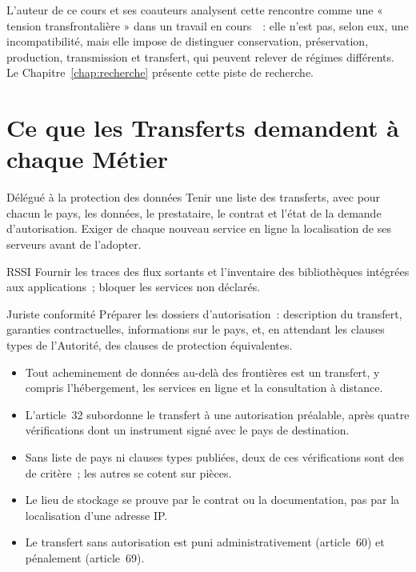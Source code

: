 L'auteur de ce cours et ses coauteurs analysent cette rencontre comme une
« tension transfrontalière » dans un travail en cours~\cite{minka2026chainepenale}~:
elle n'est pas, selon eux, une incompatibilité, mais elle impose de
distinguer conservation, préservation, production, transmission et
transfert, qui peuvent relever de régimes différents. Le
Chapitre~\ref{chap:recherche} présente cette piste de recherche.

\section{Ce que les Transferts demandent à chaque Métier}
\label{sec:c11-metiers}

\begin{boxmetier}{Délégué à la protection des données}
Tenir une liste des transferts, avec pour chacun le pays, les données, le
prestataire, le contrat et l'état de la demande d'autorisation. Exiger de
chaque nouveau service en ligne la localisation de ses serveurs avant de
l'adopter.
\end{boxmetier}

\begin{boxmetier}{RSSI}
Fournir les traces des flux sortants et l'inventaire des bibliothèques
intégrées aux applications~; bloquer les services non déclarés.
\end{boxmetier}

\begin{boxmetier}{Juriste conformité}
Préparer les dossiers d'autorisation~: description du transfert, garanties
contractuelles, informations sur le pays, et, en attendant les clauses
types de l'Autorité, des clauses de protection équivalentes.
\end{boxmetier}

\begin{boxresume}
\begin{itemize}
    \item Tout acheminement de données au-delà des frontières est un
          transfert, y compris l'hébergement, les services en ligne et la
          consultation à distance.
    \item L'article~32 subordonne le transfert à une autorisation préalable,
          après quatre vérifications dont un instrument signé avec le pays
          de destination.
    \item Sans liste de pays ni clauses types publiées, deux de ces
          vérifications sont des \NEK{} de critère~; les autres se cotent sur
          pièces.
    \item Le lieu de stockage se prouve par le contrat ou la documentation,
          pas par la localisation d'une adresse IP.
    \item Le transfert sans autorisation est puni administrativement
          (article~60) et pénalement (article~69).
\end{itemize}
\end{boxresume}

